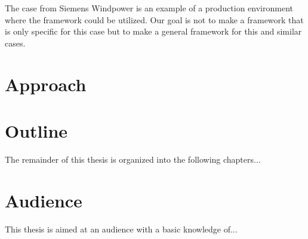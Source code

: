 The case from Siemens Windpower is an example of a production environment where the framework could be utilized. 
Our goal is not to make a framework that is only  specific for this case but to make a general framework for this and similar cases.

\section{Approach}

\section{Outline}
The remainder of this thesis is organized into the following chapters...

\section{Audience}
This thesis is aimed at an audience with a basic knowledge of...
